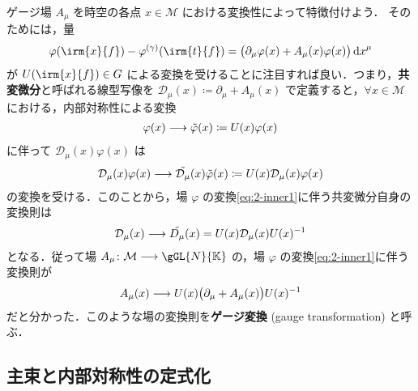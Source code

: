 \documentclass[TQFT_main]{subfiles}
\begin{document}
ゲージ場 $A_\mu$ を時空の各点 $x \in \mathcal{M}$ における変換性によって特徴付けよう．
そのためには，量
\begin{align}
    \varphi (\irm{x}{f}) - \varphi^{(\gamma)}(\irm{t}{f}) = \bigl( \partial_\mu \varphi (x) + A_\mu(x) \varphi (x) \bigr) \dd{x}^\mu
\end{align}
が $U(\irm{x}{f}) \in G$ による変換を受けることに注目すれば良い．つまり，\textbf{共変微分}と呼ばれる線型写像を $\mathcal{D}_\mu (x) \coloneqq \partial_\mu + A_\mu (x)$ で定義すると，$\forall x \in \mathcal{M}$ における，内部対称性による変換
\begin{align}
    \label{eq:2-inner1}
    \varphi(x) \longrightarrow \tilde{\varphi}(x) \coloneqq U(x) \varphi (x)
\end{align}
に伴って $\mathcal{D}_\mu (x) \varphi (x)$ は
\begin{align}
    \mathcal{D}_\mu(x) \varphi(x) \longrightarrow \tilde{\mathcal{D}_\mu} (x) \tilde{\varphi}(x) \coloneqq U(x) \mathcal{D}_\mu (x) \varphi(x)
\end{align}
の変換を受ける．このことから，場 $\varphi$ の変換\eqref{eq:2-inner1}に伴う共変微分自身の変換則は
\begin{align}
    \label{eq:def-codv-transform}
    \mathcal{D}_\mu (x) \longrightarrow \tilde{D_\mu} (x) = U(x) \mathcal{D}_\mu (x) U(x)^{-1}
\end{align}
となる．従って場 $A_\mu \colon \mathcal{M} \lto \gGL{N}{\mathbb{K}}$ の，場 $\varphi$ の変換\eqref{eq:2-inner1}に伴う変換則が
\begin{align}
    \label{eq:def-gauge-transform}
    A_\mu (x) \longrightarrow U(x)\bigl(\partial_\mu + A_\mu(x) \bigr) U(x)^{-1}
\end{align}
だと分かった．このような場の変換則を\textbf{ゲージ変換} (gauge transformation) と呼ぶ．
    

\subsection{主束と内部対称性の定式化}
\end{document}
